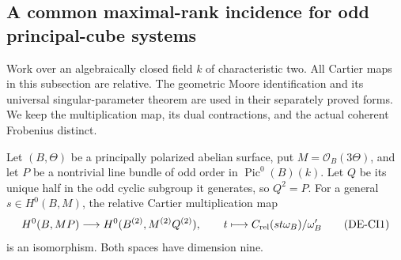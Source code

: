\subsection{A common maximal-rank incidence for odd principal-cube systems}

Work over an algebraically closed field \(k\) of characteristic two.
All Cartier maps in this subsection are relative.  The geometric
Moore identification and its universal singular-parameter theorem
are used in their separately proved forms.  We keep the multiplication
map, its dual contractions, and the actual coherent Frobenius distinct.

\begin{lemma}
\label{lem:DE-common-incidence-multiplication}
Let \((B,\Theta)\) be a principally polarized abelian surface,
put \(M=\mathcal O_B(3\Theta)\), and let \(P\) be a nontrivial
line bundle of odd order in \(\operatorname{Pic}^0(B)(k)\).
Let \(Q\) be its unique half in the odd cyclic subgroup it
generates, so \(Q^2=P\).  For a general \(s\in H^0(B,M)\),
the relative Cartier multiplication map
\[
 H^0(B,MP)\longrightarrow
 H^0(B^{(2)},M^{(2)}Q^{(2)}),\qquad
 t\longmapsto C_{\rm rel}(st\omega_B)/\omega_B'
                                                        \tag{DE-CI1}
\]
is an isomorphism.  Both spaces have dimension nine.
\end{lemma}
